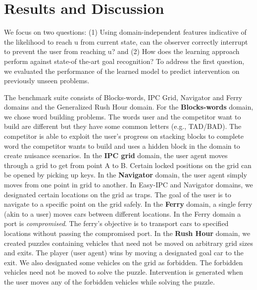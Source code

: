 \documentclass[letterpaper]{article}
\theoremstyle{plain}
\begin{document}
\section{Results and Discussion}
We focus on two questions: (1) Using domain-independent features indicative of the likelihood to reach $\mathrm{u}$ from current state, can the observer correctly interrupt to prevent the user from reaching $\mathrm{u}$? and (2) How does the learning approach perform against state-of the-art goal recognition? To address the first question, we evaluated the performance of the learned model to predict intervention on previously unseen problems.

The benchmark suite consists of Blocks-words, IPC Grid, Navigator and Ferry domains and the Generalized Rush Hour domain. For the \textbf{Blocks-words} domain, we chose word building problems. The words user and the competitor want to build are different but they have some common letters (e.g., TAD/BAD). The competitor is able to exploit the user's progress on stacking blocks to complete word the competitor wants to build and uses a hidden block in the domain to create nuisance scenarios. In the \textbf{IPC grid} domain, the user agent moves through a grid to get from point A to B. Certain locked positions on the grid can be opened by picking up keys. In the \textbf{Navigator} domain, the user agent simply moves from one point in grid to another. In Easy-IPC and Navigator domains, we designated certain locations on the grid as traps. The goal of the user is to navigate to a specific point on the grid safely. In the \textbf{Ferry} domain, a single ferry (akin to a user) moves cars between different locations. In the Ferry domain a port is \emph{compromised}. The ferry's objective is to transport cars to specified locations without passing the compromised port. In the \textbf{Rush Hour} domain, we created puzzles containing vehicles that need not be moved on arbitrary grid sizes and exits. The player (user agent) wins by moving a designated goal car to the exit. We also designated some vehicles on the grid as forbidden. The forbidden vehicles need not be moved to solve the puzzle. Intervention is generated when the user moves any of the forbidden vehicles while solving the puzzle.
\end{document}
